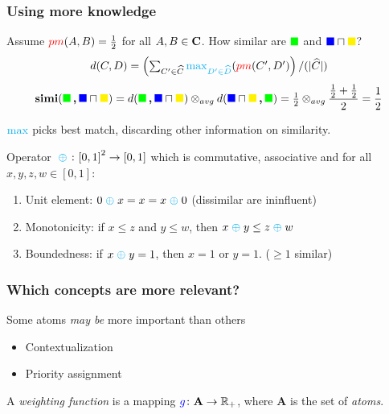 \documentclass[smaller, dvipsnames]{beamer}
\begin{document}
\begin{frame}
  \frametitle{Using more knowledge}
  Assume \(\mypm(A,B) = \tfrac{1}{2}\) for all \(A,B \in \Conc\).
  How similar are \(\colour{green}\) and \(\colour{blue} \sqcap \colour{yellow}\)?
     \begin{equation*}
      d(C,D) = \left(\textstyle{\sum_{C^\prime \in \atom{C}}%
      \textcolor{cyan}{\max_{D^\prime \in \atom{D}}}}%
      (\mypm(C^\prime, D^\prime)\right)/(\abs{\atom{C}})
     \end{equation*}
      \begin{equation*}
          \simi(\colour{green}\,\text{\textbf{,}}\,\colour{blue} \sqcap \colour{yellow}) = d(\colour{green}\,\text{\textbf{,}}\,\colour{blue} \sqcap \colour{yellow}) \otimes_{avg} d(\colour{blue} \sqcap \colour{yellow}\,\text{\textbf{,}}\, \colour{green})= \tfrac12 \otimes_{avg} \frac{\tfrac12 + \tfrac12}{2} = \frac{1}{2}
      \end{equation*}

  \(\textcolor{cyan}{\max}\) picks best match, discarding other information on similarity.
  \pause
  \begin{definition}
    Operator \(\myconorm \colon {[0,1]}^2 \to [0,1]\) which is
    commutative, associative and for all
    \(x, y, z, w \in [0,1]\):
    \begin{enumerate}
      \item \alert{Unit element}: \(0 \myconorm x = x = x \myconorm 0\) (dissimilar are ininfluent)
      \item \alert{Monotonicity}: if \(x \le z\) and \(y \le w\), then \(x \myconorm y \le z \myconorm w\)
      \item \alert{Boundedness}: if \(x \myconorm y = 1\), then \(x = 1\) or \(y = 1\). (\(\ge 1\) similar)
    \end{enumerate}
  \end{definition}
\end{frame}

\begin{frame}
  \frametitle{Which concepts are more relevant?}
  Some atoms \textit{may be} more important than others
  \begin{itemize}
    \item Contextualization
    \item Priority assignment
  \end{itemize}
  \begin{definition}
    A \emph{weighting function} is a mapping 
    \(\myg \colon \mathbf{A} \to \mathbb{R}_+\),
     where \(\mathbf{A}\) is the set of \emph{atoms}.
  \end{definition}
\end{frame}
\end{document}
